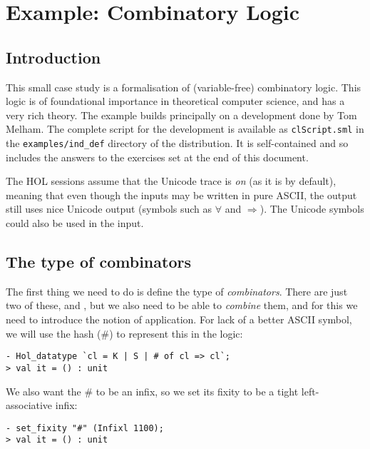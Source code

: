 \newcommand{\eos}{\hfill{}$\cdots\diamond\cdots$\hfill{}\vspace{5mm}}

\newcommand{\mathpredn}{\mathbin{-\!\!\!\mid\mid\!\rightarrow}}

\newcommand{\KC}{\con{K}}
\newcommand{\SC}{\con{S}}
\newcommand{\bk}{\char'134}


\chapter{Example: Combinatory Logic}
\label{chap:combin}

\section{Introduction}
\label{sec:Introduction}

This small case study is a formalisation of (variable-free)
combinatory logic.  This logic is of foundational importance in
theoretical computer science, and has a very rich theory.  The example
builds principally on a development done by Tom Melham.  The complete
script for the development is available as \texttt{clScript.sml} in
the \texttt{examples/ind\_def} directory of the distribution.  It is
self-contained and so includes the answers to the exercises set at the
end of this document.

The HOL sessions assume that the Unicode trace is \emph{on} (as it is
by default), meaning that even though the inputs may be written in
pure ASCII, the output still uses nice Unicode output (symbols such as
$\forall$ and $\Rightarrow$).  The Unicode symbols could also be used
in the input.


\section{The type of combinators}
\label{sec:Type-Combinators}

The first thing we need to do is define the type of
\emph{combinators}.  There are just two of these, \KC{} and \SC, but
we also need to be able to \emph{combine} them, and for this we need
to introduce the notion of application.  For lack of a better ASCII
symbol, we will use the hash (\#) to represent this in the logic:
\setcounter{sessioncount}{0}
\begin{session}
\begin{verbatim}
- Hol_datatype `cl = K | S | # of cl => cl`;
> val it = () : unit
\end{verbatim}
\end{session}
We also want the \# to be an infix, so we set its fixity to be a tight
left-associative infix:
\begin{session}
\begin{verbatim}
- set_fixity "#" (Infixl 1100);
> val it = () : unit
\end{verbatim}
\end{session}


